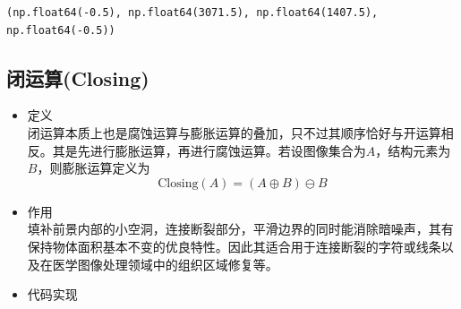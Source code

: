 \documentclass[11pt]{article}
\makeatletter
\newcommand{\boxspacing}{\kern\kvtcb@left@rule\kern\kvtcb@boxsep}
\newcommand{\prompt}[4]{
	{\ttfamily\llap{{\color{#2}[#3]:\hspace{3pt}#4}}\vspace{-\baselineskip}}
}
\makeatother
\begin{document}
            \begin{tcolorbox}[breakable, size=fbox, boxrule=.5pt, pad at break*=1mm, opacityfill=0]
\begin{Verbatim}[commandchars=\\\{\}]
(np.float64(-0.5), np.float64(3071.5), np.float64(1407.5), np.float64(-0.5))
\end{Verbatim}
\end{tcolorbox}
        
        
    \begin{center}
    \end{center}
    
    
 \subsection{闭运算(Closing)}
\begin{itemize}
	\item 定义\\
	闭运算本质上也是腐蚀运算与膨胀运算的叠加，只不过其顺序恰好与开运算相反。其是先进行膨胀运算，再进行腐蚀运算。若设图像集合为$A$，结构元素为$B$，则膨胀运算定义为
	$$\text{Closing}(A)=(A\oplus B)\ominus B$$
	\item 作用\\
	填补前景内部的小空洞，连接断裂部分，平滑边界的同时能消除暗噪声，其有保持物体面积基本不变的优良特性。因此其适合用于连接断裂的字符或线条以及在医学图像处理领域中的组织区域修复等。
	\item 代码实现
	\begin{center}
	\end{center}
\end{itemize}
\end{document}
